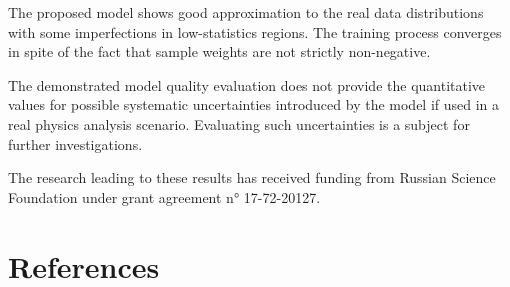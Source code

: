 \documentclass[a4paper]{jpconf}
\begin{document}
The proposed model shows good approximation to the real data distributions with some imperfections in low-statistics regions. The training process converges in spite of the fact that sample weights are not strictly non-negative.

The demonstrated model quality evaluation does not provide the quantitative values for possible systematic uncertainties introduced by the model if used in a real physics analysis scenario. Evaluating such uncertainties is a subject for further investigations.

\ack
The research leading to these results has received funding from Russian Science Foundation under grant agreement n° 17-72-20127.

\section*{References}


\end{document}
